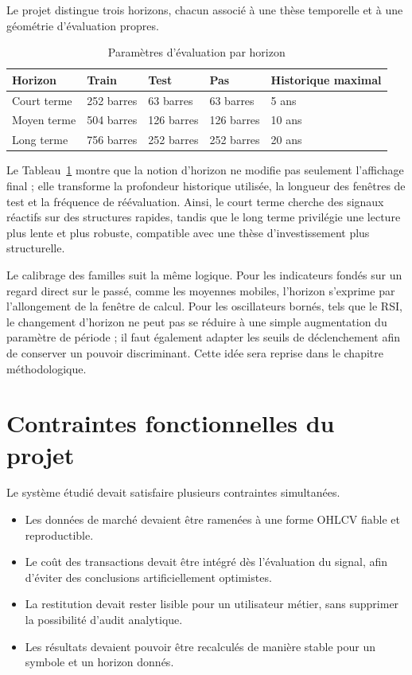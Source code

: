 Le projet distingue trois horizons, chacun associé à une thèse temporelle et à
une géométrie d'évaluation propres.

\begin{table}[H]
\centering
\caption{Paramètres d'évaluation par horizon}
\label{tab:horizon-eval}
\begin{tabular}{p{2.6cm}p{2.3cm}p{2.3cm}p{2.3cm}p{3cm}}
\toprule
\textbf{Horizon} & \textbf{Train} & \textbf{Test} & \textbf{Pas} & \textbf{Historique maximal} \\
\midrule
Court terme & 252 barres & 63 barres & 63 barres & 5 ans \\
Moyen terme & 504 barres & 126 barres & 126 barres & 10 ans \\
Long terme & 756 barres & 252 barres & 252 barres & 20 ans \\
\bottomrule
\end{tabular}
\end{table}

Le Tableau~\ref{tab:horizon-eval} montre que la notion d'horizon ne modifie pas
seulement l'affichage final ; elle transforme la profondeur historique utilisée,
la longueur des fenêtres de test et la fréquence de réévaluation. Ainsi, le
court terme cherche des signaux réactifs sur des structures rapides, tandis que
le long terme privilégie une lecture plus lente et plus robuste, compatible avec
une thèse d'investissement plus structurelle.

Le calibrage des familles suit la même logique. Pour les indicateurs fondés sur
un regard direct sur le passé, comme les moyennes mobiles, l'horizon s'exprime
par l'allongement de la fenêtre de calcul. Pour les oscillateurs bornés, tels
que le RSI, le changement d'horizon ne peut pas se réduire à une simple
augmentation du paramètre de période ; il faut également adapter les seuils de
déclenchement afin de conserver un pouvoir discriminant. Cette idée sera
reprise dans le chapitre méthodologique.

\section{Contraintes fonctionnelles du projet}
Le système étudié devait satisfaire plusieurs contraintes simultanées.
\begin{itemize}
\item Les données de marché devaient être ramenées à une forme OHLCV fiable et
reproductible.
\item Le coût des transactions devait être intégré dès l'évaluation du signal,
afin d'éviter des conclusions artificiellement optimistes.
\item La restitution devait rester lisible pour un utilisateur métier, sans
supprimer la possibilité d'audit analytique.
\item Les résultats devaient pouvoir être recalculés de manière stable pour un
symbole et un horizon donnés.
\end{itemize}

